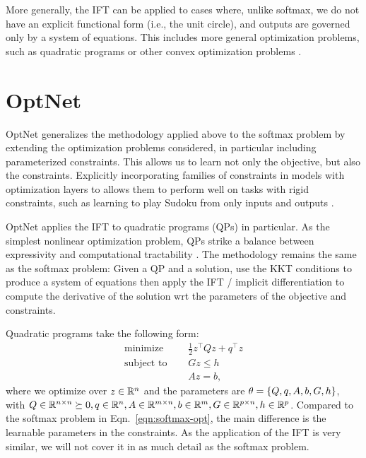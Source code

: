 \documentclass[11pt]{article}
\begin{document}
More generally, the IFT can be applied to cases where, unlike softmax,
we do not have an explicit functional form (i.e., the unit circle),
and outputs are governed only by a system of equations.
This includes more general optimization problems, such as quadratic programs \citep{optnet}
or other convex optimization problems \citep{agrawal2019diffcvx}.

\section{OptNet}
OptNet generalizes the methodology applied above to the softmax problem by
extending the optimization problems considered,
in particular including parameterized constraints.
This allows us to learn not only the objective, but also the constraints.
Explicitly incorporating families of constraints in models
with optimization layers to allows them to perform well
on tasks with rigid constraints, such as learning to play
Sudoku from only inputs and outputs \citep{optnet}.

OptNet applies the IFT to quadratic programs (QPs) in particular.
As the simplest nonlinear optimization problem,
QPs strike a balance between expressivity and computational tractability \citep{simplex}.
The methodology remains the same as the softmax problem:
Given a QP and a solution,
use the KKT conditions to produce a system of equations then apply the IFT
/ implicit differentiation to compute the derivative of the solution wrt the
parameters of the objective and constraints.

Quadratic programs take the following form:
\begin{equation}
\label{eqn:qp}
\begin{aligned}
\textrm{minimize } \quad & \frac12 z^\top Q z + q^\top z\\
\textrm{subject to } \quad
& Gz \leq h\\
& Az = b,
\end{aligned}
\end{equation}
where we optimize over $z\in\mathbb{R}^n$ and the parameters are $\theta = \left\{Q, q, A, b, G, h\right\}$,
with $Q\in\mathbb{R}^{n\times n}\succeq0, q\in\mathbb{R}^n, A\in\mathbb{R}^{m\times n},b\in\mathbb{R}^{m},G\in\mathbb{R}^{p\times n},
h\in\mathbb{R}^p$.
Compared to the softmax problem in Eqn.~\ref{eqn:softmax-opt},
the main difference is the learnable parameters in the constraints.
As the application of the IFT is very similar, we will not cover it in as much
detail as the softmax problem.
\end{document}
